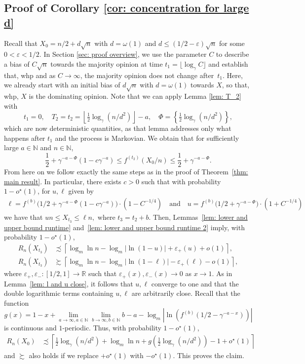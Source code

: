 \documentclass[11pt]{article}
\numberwithin{theorem}{section}
\begin{document}
\subsection{Proof of Corollary \ref{cor: concentration for large d}}
Recall that $X_0=n/2 +d\sqrt{n}$ with $d=\omega(1)$ and $d\leq (1/2-\varepsilon)\sqrt{n}$ for some $0<\varepsilon< 1/2$. In Section \ref{sec: proof overview}, we use the parameter $C$ to describe a bias of $C\sqrt{n}$ towards the majority opinion at time $t_1=\lfloor\log_\gamma C \rfloor$ and establish that, whp and as $C\to \infty$, the majority opinion does not change after~$t_1$.
Here, we already start with an initial bias of $d\sqrt{n}$ with $d=\omega(1)$ towards $X$, so that, whp, $X$ is the dominating opinion.
Note that we can apply Lemma \ref{lem: T_2} with
\[
    t_1=0,
    \quad T_2 = t_2=\left\lfloor\tfrac{1}{2}\log_\gamma(n/d^2)\right\rfloor -a,
    \quad \Phi=\left\{\tfrac{1}{2}\log_\gamma(n/d^2)\right\},
\]
which are now deterministic quantities, as that lemma addresses only what happens after $t_1$ and the process is Markovian.
We obtain that for sufficiently large $a\in \mathbb{N}$ and $n\in\mathbb{N}$, 
\[
    \frac12 + \gamma^{-a-\Phi} (1-c\gamma^{-a}) \leq f^{(t_2)}(X_{0}/n) \leq \frac12 + \gamma^{-a-\Phi}.
\]
From here on we follow exactly the same steps as in the proof of Theorem~\ref{thm: main result}. In particular, there exists $c>0$ such that with probability $1-o^\star(1)$, for $u,\ell$ given by
\begin{align*}
    \ell =f^{(b)}\big(1/2+\gamma^{-a-\Phi}(1-c\gamma^{-a})\big) \cdot (1-C^{-1/4})
    \quad\text{and}\quad
    u= f^{(b)}\big(1/2+\gamma^{-a-\Phi}\big)\cdot(1+C^{-1/4})
\end{align*}
we have that $un\leq X_{t_3}\leq \ell n, \text{ where } t_3=t_2+b$.
Then, Lemmas~\ref{lem: lower and upper bound runtime} and~\ref{lem: lower and upper bound runtime 2} imply, with probability $1-o^\star(1)$, 
\begin{align*}
    R_n(X_{t_3}) &\precsim\left\lceil \log_m\ln n -\log_m|\ln(1-u)|+\varepsilon_+(u)+o(1)  \right\rceil, \\
    R_n(X_{t_3}) &\succsim\left\lceil \log_m\ln n -\log_m|\ln(1-\ell)|-\varepsilon_+(\ell)-o(1)  \right\rceil,      
\end{align*}
where $\varepsilon_+,\varepsilon_-:[1/2,1] \to \mathbb{R}$ such that $\varepsilon_+(x), \varepsilon_-(x) \to 0$ as $x \to 1$.
As in Lemma~\ref{lem: l and u close}, it follows that $u,\ell$ converge to one and that the double logarithmic terms containing $u,\ell$ are arbitrarily close. 
Recall that the function
\[
    g(x)=1-x+\lim_{a\to \infty, a\in\mathbb{N}} \lim_{b \to \infty, b\in \mathbb{N}} b-a- \log_m|\ln( f^{(b)}(1/2-\gamma^{-a-x}))|
\]
is continuous and $1$-periodic.
Thus, with probability $1-o^\star(1)$,
\begin{align*}
    R_n(X_0) &\precsim \left\lceil \tfrac{1}{2}\log_\gamma (n/d^2)+\log_m\ln n+g\left(\tfrac{1}{2}\log_\gamma(n/d^2)\right)-1+o^\star(1)\right\rceil
\end{align*}
and $\succsim$ also holds if we replace $+o^\star(1)$ with $-o^\star(1)$. This proves the claim.
\end{document}

